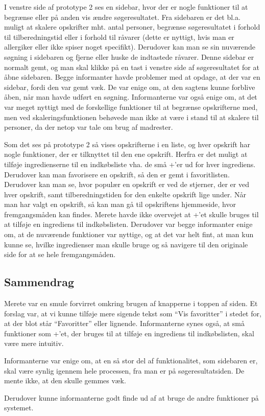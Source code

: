 I venstre side af prototype 2 ses en sidebar, hvor der er nogle funktioner til at begrænse eller på anden vis ændre søgeresultatet. Fra sidebaren er det bl.a. muligt at skalere opskrifter mht. antal personer, begrænse søgeresultatet i forhold til tilberedningstid eller i forhold til råvarer (dette er nyttigt, hvis man \fx er allergiker eller ikke spiser noget specifikt). Derudover kan man se sin nuværende søgning i sidebaren og fjerne eller huske de indtastede råvarer. Denne sidebar er normalt gemt, og man skal klikke på en tast i venstre side af søgeresultatet for at åbne sidebaren. Begge informanter havde problemer med at opdage, at der var en sidebar, fordi den var gemt væk. De var enige om, at den sagtens kunne forblive åben, når man havde udført en søgning. Informanterne var også enige om, at det var meget nyttigt med de forskellige funktioner til at begrænse opskrifterne med, men \fx ved skaleringsfunktionen behøvede man ikke at være i stand til at skalere til  personer, da der netop var tale om brug af madrester. 

Som det ses på prototype 2 så vises opskrifterne i en liste, og hver opskrift har nogle funktioner, der er tilknyttet til den ene opskrift. Herfra er det muligt at tilføje ingredienserne til en indkøbsliste vha. de små +'er ud for hver ingrediens. Derudover kan man favorisere en opskrift, så den er gemt i favoritlisten. Derudover kan man se, hvor populær en opskrift er ved de stjerner, der er ved hver opskrift, samt tilberedningstiden for den enkelte opskrift lige under. Når man har valgt en opskrift, så kan man gå til opskriftens hjemmeside, hvor fremgangsmåden kan findes. Merete havde ikke overvejet at +'et skulle bruges til at tilføje en ingrediens til indkøbslisten. Derudover var begge informanter enige om, at de nuværende funktioner var nyttige, og at det var helt fint, at man kun kunne se, hvilke ingredienser man skulle bruge og så navigere til den originale side for at se hele fremgangsmåden.

\subsection{Sammendrag}
Merete var en smule forvirret omkring brugen af knapperne i toppen af siden. Et forslag var, at vi kunne tilføje mere sigende tekst som ``Vis favoritter'' i stedet for, at der blot står ``Favoritter'' eller lignende. Informanterne synes også, at små funktioner som +'et, der bruges til at tilføje en ingrediens til indkøbslisten, skal være mere intuitiv.

Informanterne var enige om, at en så stor del af funktionalitet, som sidebaren er, skal være synlig igennem hele processen, fra man er på søgeresultatsiden. De mente ikke, at den skulle gemmes væk.

Derudover kunne informanterne godt finde ud af at bruge de andre funktioner på systemet.